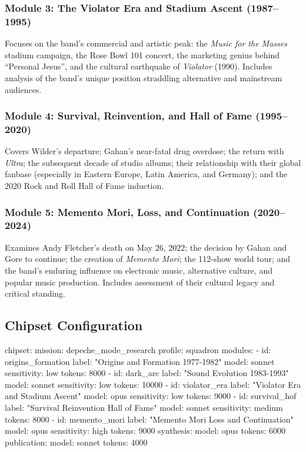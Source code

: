 \documentclass[11pt,letterpaper]{article}
\begin{document}
\subsubsection{Module 3: The Violator Era and Stadium Ascent (1987--1995)}
Focuses on the band's commercial and artistic peak: the \textit{Music for the Masses} stadium campaign, the Rose Bowl 101 concert, the marketing genius behind ``Personal Jesus'', and the cultural earthquake of \textit{Violator} (1990). Includes analysis of the band's unique position straddling alternative and mainstream audiences.

\subsubsection{Module 4: Survival, Reinvention, and Hall of Fame (1995--2020)}
Covers Wilder's departure; Gahan's near-fatal drug overdose; the return with \textit{Ultra}; the subsequent decade of studio albums; their relationship with their global fanbase (especially in Eastern Europe, Latin America, and Germany); and the 2020 Rock and Roll Hall of Fame induction.

\subsubsection{Module 5: Memento Mori, Loss, and Continuation (2020--2024)}
Examines Andy Fletcher's death on May 26, 2022; the decision by Gahan and Gore to continue; the creation of \textit{Memento Mori}; the 112-show world tour; and the band's enduring influence on electronic music, alternative culture, and popular music production. Includes assessment of their cultural legacy and critical standing.

\subsection{Chipset Configuration}

\begin{asciibox}
chipset:
  mission: depeche_mode_research
  profile: squadron
  modules:
    - id: origins_formation
      label: "Origins and Formation 1977-1982"
      model: sonnet
      sensitivity: low
      tokens: 8000
    - id: dark_arc
      label: "Sound Evolution 1983-1993"
      model: sonnet
      sensitivity: low
      tokens: 10000
    - id: violator_era
      label: "Violator Era and Stadium Ascent"
      model: opus
      sensitivity: low
      tokens: 9000
    - id: survival_hof
      label: "Survival Reinvention Hall of Fame"
      model: sonnet
      sensitivity: medium
      tokens: 8000
    - id: memento_mori
      label: "Memento Mori Loss and Continuation"
      model: opus
      sensitivity: high
      tokens: 9000
  synthesis:
    model: opus
    tokens: 6000
  publication:
    model: sonnet
    tokens: 4000
\end{asciibox}
\end{document}
